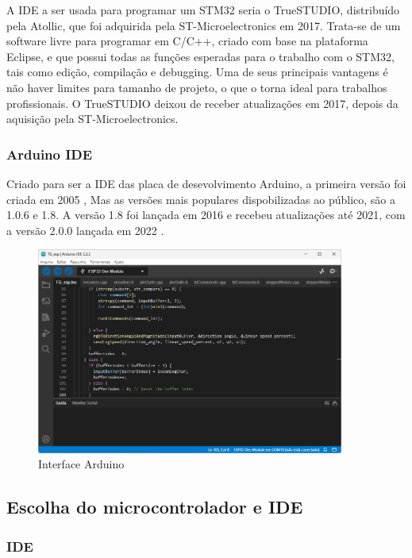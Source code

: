 A IDE a ser usada para programar um STM32 seria o TrueSTUDIO, distribuído pela
Atollic, que foi adquirida pela ST-Microelectronics em 2017. Trata-se de um
software livre para programar em C/C++, criado com base na plataforma Eclipse,
e que possui todas as funções esperadas para o trabalho com o STM32, tais como
edição, compilação e debugging. Uma de seus principais vantagens é não haver
limites para tamanho de projeto, o que o torna ideal para trabalhos
profissionais. O TrueSTUDIO deixou de receber atualizações em 2017,
depois da aquisição pela ST-Microelectronics.\cite{apostila_microprossados}


\subsubsection{Arduino IDE}

Criado para ser a IDE das placa de desevolvimento Arduino, a primeira versão foi criada em 2005 \cite{arduino_id_history},
Mas as versões mais populares dispobilizadas ao público, são a 1.0.6 e 1.8. 
A versão 1.8 foi lançada em 2016 e recebeu atualizações até 2021, 
com a versão 2.0.0 lançada em 2022 \cite{arduino_tag_2}.

\begin{figure}[ht]
	\centering
	\includegraphics[width=0.9\textwidth]{figures/arduino}
	\caption{Interface Arduino}
\end{figure}

\subsection{Escolha do microcontrolador e IDE}

\subsubsection{IDE}

